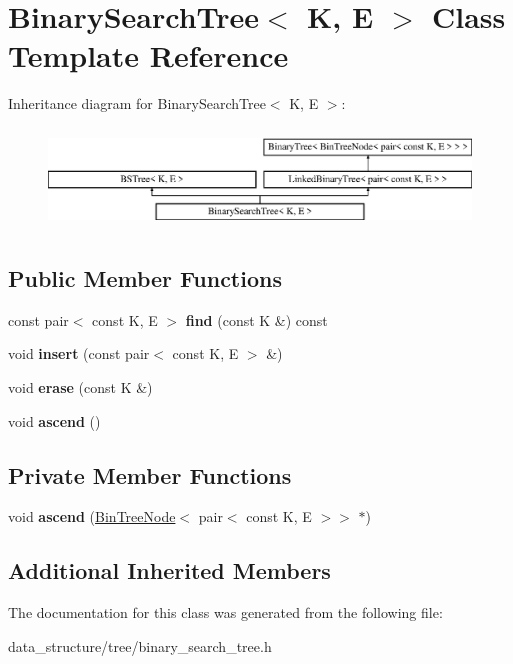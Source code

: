 \hypertarget{classBinarySearchTree}{}\section{Binary\+Search\+Tree$<$ K, E $>$ Class Template Reference}
\label{classBinarySearchTree}
Inheritance diagram for Binary\+Search\+Tree$<$ K, E $>$\+:\begin{figure}[H]
\begin{center}
\leavevmode
\includegraphics[height=2.700965cm]{classBinarySearchTree}
\end{center}
\end{figure}
\subsection*{Public Member Functions}
\begin{DoxyCompactItemize}
\item 
\mbox{\label{classBinarySearchTree_a44aafb261ff5b712be534743cfa88678}} 
const pair$<$ const K, E $>$ {\bfseries find} (const K \&) const
\item 
\mbox{\label{classBinarySearchTree_a316a8f1205b0b49bf7e6a49a26d595d9}} 
void {\bfseries insert} (const pair$<$ const K, E $>$ \&)
\item 
\mbox{\label{classBinarySearchTree_a755fe515b0c387f2e4decee262d08984}} 
void {\bfseries erase} (const K \&)
\item 
\mbox{\label{classBinarySearchTree_a637150c98765c148117ed3e96bc90e05}} 
void {\bfseries ascend} ()
\end{DoxyCompactItemize}
\subsection*{Private Member Functions}
\begin{DoxyCompactItemize}
\item 
\mbox{\label{classBinarySearchTree_a5a0d9865d5c5c0780f9abc756547a2bc}} 
void {\bfseries ascend} (\hyperlink{structBinTreeNode}{Bin\+Tree\+Node}$<$ pair$<$ const K, E $>$$>$ $\ast$)
\end{DoxyCompactItemize}
\subsection*{Additional Inherited Members}


The documentation for this class was generated from the following file\+:\begin{DoxyCompactItemize}
\item 
data\+\_\+structure/tree/binary\+\_\+search\+\_\+tree.\+h\end{DoxyCompactItemize}
